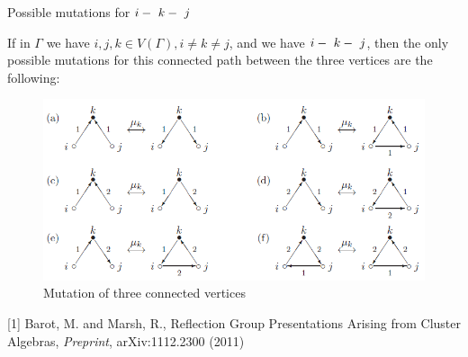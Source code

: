 \documentclass{beamer}
\begin{document}
\begin{frame}{Possible mutations for $i\--\ k\--\ j$}
\begin{corollary}
If in $\Gamma$ we have $i,j,k \in V(\Gamma), i \neq k \neq j$, and we have $i\--\ k\--\ j$, then the only possible mutations for this connected path between the three vertices are the following:
\begin{figure}[h]
\centering
\includegraphics[scale = .40]{mutation3path.PNG}
\caption{Mutation of three connected vertices}
\end{figure}
\end{corollary}
\end{frame}

\begin{frame}
\begin{thebibliography}{69}

[1] Barot, M. and Marsh, R., Reflection Group Presentations Arising from Cluster Algebras, \emph{Preprint}, arXiv:1112.2300 (2011)


\end{thebibliography}

\end{frame}
\end{document}
